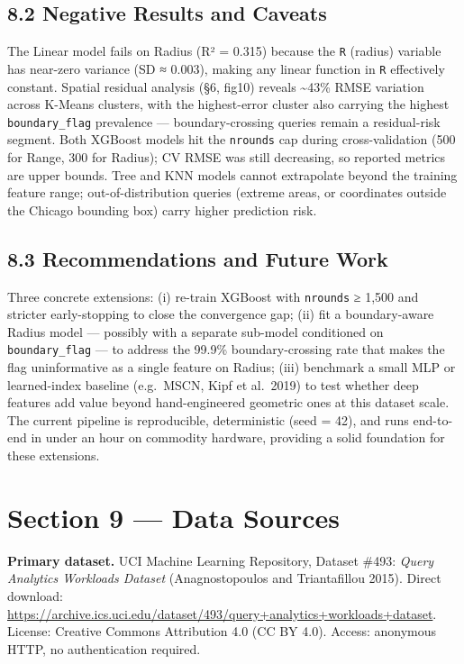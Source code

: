 \documentclass[
  10pt,
  twocolumn,
  10pt]{article}
\begin{document}
\subsection{8.2 Negative Results and
Caveats}\label{negative-results-and-caveats}

The Linear model fails on Radius (R² = 0.315) because the \texttt{R}
(radius) variable has near-zero variance (SD ≈ 0.003), making any linear
function in \texttt{R} effectively constant. Spatial residual analysis
(§6, fig10) reveals \textasciitilde43\% RMSE variation across K-Means
clusters, with the highest-error cluster also carrying the highest
\texttt{boundary\_flag} prevalence --- boundary-crossing queries remain
a residual-risk segment. Both XGBoost models hit the \texttt{nrounds}
cap during cross-validation (500 for Range, 300 for Radius); CV RMSE was
still decreasing, so reported metrics are upper bounds. Tree and KNN
models cannot extrapolate beyond the training feature range;
out-of-distribution queries (extreme areas, or coordinates outside the
Chicago bounding box) carry higher prediction risk.

\subsection{8.3 Recommendations and Future
Work}\label{recommendations-and-future-work}

Three concrete extensions: (i) re-train XGBoost with \texttt{nrounds} ≥
1,500 and stricter early-stopping to close the convergence gap; (ii) fit
a boundary-aware Radius model --- possibly with a separate sub-model
conditioned on \texttt{boundary\_flag} --- to address the 99.9\%
boundary-crossing rate that makes the flag uninformative as a single
feature on Radius; (iii) benchmark a small MLP or learned-index baseline
(e.g.~MSCN, Kipf et al.~2019) to test whether deep features add value
beyond hand-engineered geometric ones at this dataset scale. The current
pipeline is reproducible, deterministic (seed = 42), and runs end-to-end
in under an hour on commodity hardware, providing a solid foundation for
these extensions.

\section{Section 9 --- Data Sources}\label{section-9-data-sources}

\textbf{Primary dataset.} UCI Machine Learning Repository, Dataset
\#493: \emph{Query Analytics Workloads Dataset} (Anagnostopoulos and
Triantafillou 2015). Direct download:
\url{https://archive.ics.uci.edu/dataset/493/query+analytics+workloads+dataset}.
License: Creative Commons Attribution 4.0 (CC BY 4.0). Access: anonymous
HTTP, no authentication required.
\end{document}
